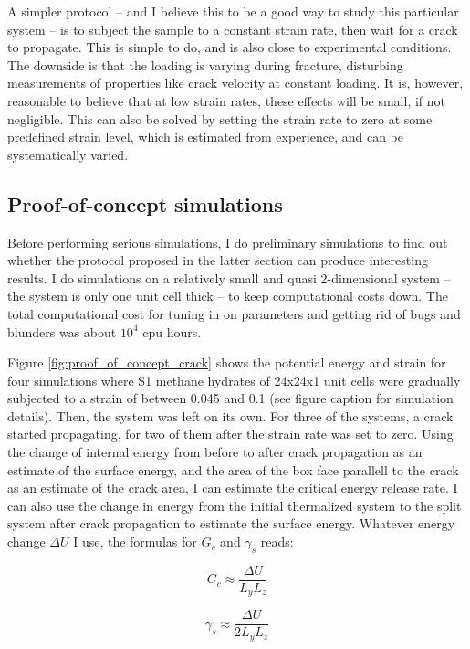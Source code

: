 A simpler protocol -- and I believe this to be a good way to study this particular system -- is to subject the sample to a constant strain rate, then wait for a crack to propagate. This is simple to do, and is also close to experimental conditions. The downside is that the loading is varying during fracture, disturbing measurements of properties like crack velocity at constant loading. It is, however, reasonable to believe that at low strain rates, these effects will be small, if not negligible. This can also be solved by setting the strain rate to zero at some predefined strain level, which is estimated from experience, and can be systematically varied. 


\subsection{Proof-of-concept simulations}
Before performing serious simulations, I do preliminary simulations to find out whether the protocol proposed in the latter section can produce interesting results. I do simulations on a relatively small and quasi 2-dimensional system -- the system is only one unit cell thick -- to keep computational costs down. The total computational cost for tuning in on parameters and getting rid of bugs and blunders was about $10^4$ cpu hours.

Figure \ref{fig:proof_of_concept_crack} shows the potential energy and strain for four simulations where S1 methane hydrates of 24x24x1 unit cells were gradually subjected to a strain of between 0.045 and 0.1 (see figure caption for simulation details). Then, the system was left on its own. For three of the systems, a crack started propagating, for two of them after the strain rate was set to zero. Using the change of internal energy from before to after crack propagation as an estimate of the surface energy, and the area of the box face parallell to the crack as an estimate of the crack area, I can estimate the critical energy release rate. I can also use the change in energy from the initial thermalized system to the split system after crack propagation to estimate the surface energy. Whatever energy change $\Delta U$ I use, the formulas for $G_c$ and $\gamma_s$ reads:

\begin{equation}
	G_c \approx \frac{\Delta U}{L_yL_z}
\end{equation}

\begin{equation}
	\gamma_s \approx \frac{\Delta U}{2 L_y L_z}
\end{equation}

